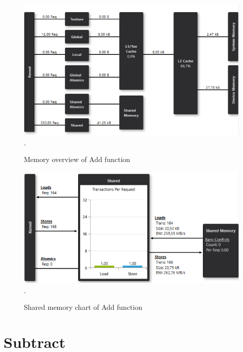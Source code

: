 \documentclass[oneside,openright,12pt,final,en]{mgr}
\begin{document}
\begin{figure}[H]
	\centering
	\includegraphics[width=\textwidth]{add_memory}.
	\caption{Memory overview of Add function}
	\label{fig:add_memory}
\end{figure}

\begin{figure}[H]
	\centering
	\includegraphics[width=\textwidth]{add_shared}.
	\caption{Shared memory chart of Add function}
	\label{fig:add_shared}
\end{figure}

\section{Subtract}
\end{document}
